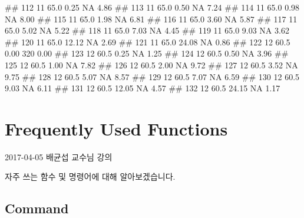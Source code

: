 \documentclass[10pt,]{krantz}
\makeatletter
\newenvironment{Shaded}{\begin{snugshade}}{\end{snugshade}}
\newcommand{\NormalTok}[1]{#1}
\renewenvironment{quote}{\begin{VF}}{\end{VF}}
\newenvironment{kframe}{%
\medskip{}
\setlength{\fboxsep}{.8em}
 \def\at@end@of@kframe{}%
 \ifinner\ifhmode%
  \def\at@end@of@kframe{\end{minipage}}%
  \begin{minipage}{\columnwidth}%
 \fi\fi%
 \def\FrameCommand##1{\hskip\@totalleftmargin \hskip-\fboxsep
 \colorbox{shadecolor}{##1}\hskip-\fboxsep
     \hskip-\linewidth \hskip-\@totalleftmargin \hskip\columnwidth}%
 \MakeFramed {\advance\hsize-\width
   \@totalleftmargin\z@ \linewidth\hsize
   \@setminipage}}%
 {\par\unskip\endMakeFramed%
 \at@end@of@kframe}
\renewenvironment{Shaded}{\begin{kframe}}{\end{kframe}}
\theoremstyle{definition}
\theoremstyle{definition}
\theoremstyle{remark}
\makeatother
\begin{document}
\begin{Shaded}
\begin{Highlighting}[]
\NormalTok{## 112 11 65.0  0.25  NA  4.86}
\NormalTok{## 113 11 65.0  0.50  NA  7.24}
\NormalTok{## 114 11 65.0  0.98  NA  8.00}
\NormalTok{## 115 11 65.0  1.98  NA  6.81}
\NormalTok{## 116 11 65.0  3.60  NA  5.87}
\NormalTok{## 117 11 65.0  5.02  NA  5.22}
\NormalTok{## 118 11 65.0  7.03  NA  4.45}
\NormalTok{## 119 11 65.0  9.03  NA  3.62}
\NormalTok{## 120 11 65.0 12.12  NA  2.69}
\NormalTok{## 121 11 65.0 24.08  NA  0.86}
\NormalTok{## 122 12 60.5  0.00 320  0.00}
\NormalTok{## 123 12 60.5  0.25  NA  1.25}
\NormalTok{## 124 12 60.5  0.50  NA  3.96}
\NormalTok{## 125 12 60.5  1.00  NA  7.82}
\NormalTok{## 126 12 60.5  2.00  NA  9.72}
\NormalTok{## 127 12 60.5  3.52  NA  9.75}
\NormalTok{## 128 12 60.5  5.07  NA  8.57}
\NormalTok{## 129 12 60.5  7.07  NA  6.59}
\NormalTok{## 130 12 60.5  9.03  NA  6.11}
\NormalTok{## 131 12 60.5 12.05  NA  4.57}
\NormalTok{## 132 12 60.5 24.15  NA  1.17}
\end{Highlighting}
\end{Shaded}

\chapter{Frequently Used Functions}\label{frequently-used-functions}

\begin{quote}
2017-04-05 배균섭 교수님 강의
\end{quote}

자주 쓰는 함수 및 명령어에 대해 알아보겠습니다.

\section{Command}\label{command}
\end{document}
